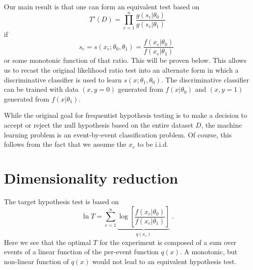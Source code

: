 \documentclass[11pt, oneside]{article}   	%
\begin{document}
Our main result is that one can form an equivalent test based on 
\begin{equation}\label{eq:equivLRtest}
T'(D) = \prod_{e=1}^n \frac{ g(s_e | \theta_0)}{ g(s_e | \theta_1)}
\end{equation}
if 
\begin{equation}
s_e = s(x_e; \theta_0, \theta_1) = \frac{ f(x_e|\theta_0)}{ f(x_e|\theta_1)} \; 
\end{equation}
or some monotonic function of that ratio. This will be proven below.
This allows us to recast the original likelihood ratio test into an alternate form in which a discriminative classifier is 
used to learn $s(x; \theta_1, \theta_0)$. The discriminative classifier can be trained with data $(x,y=0)$ generated 
from $f(x|\theta_0)$ and $(x,y=1)$ generated from $f(x|\theta_1)$.

While the original goal for frequentist hypothesis testing is to make a decision to accept or reject the null hypothesis based on the entire dataset $D$, the machine learning problem is an event-by-event classification problem. Of course, this follows from the fact that we assume the $x_e$ to be i.i.d.

\section{Dimensionality reduction}


 The target hypothesis test is based on 
\begin{equation}
\ln T =   \sum_{e=1}^n \underbrace{\log \left[ \frac {f(x_e | \theta_0) }{ f(x_e | \theta_1) } \right]}_{q(x_e)} \;.
\end{equation}
Here we see that the optimal $T$ for the experiment is composed of a sum over events of a  linear function of the per-event function $q(x)$. A monotonic, but non-linear function of $q(x)$ would not lead to an equivalent hypothesis test. 
\end{document}
